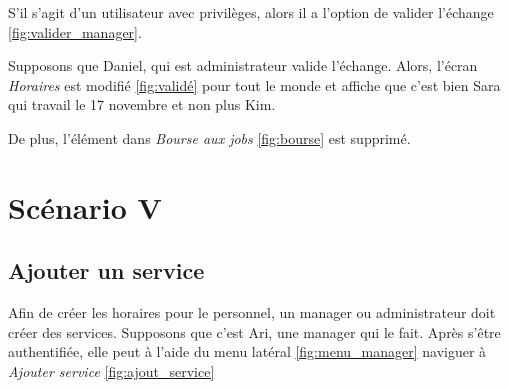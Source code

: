 S'il s'agit d'un utilisateur avec privilèges, alors il a l'option de valider l'échange \ref{fig:valider_manager}. 

Supposons que Daniel, qui est administrateur valide l'échange. Alors, l'écran \textit{Horaires} est modifié \ref{fig:validé}
pour tout le monde et affiche que c'est bien Sara qui travail le 17 novembre et non plus Kim. 

De plus, l'élément dans \textit{Bourse aux jobs} \ref{fig:bourse} est supprimé.
\newpage
\section[Ajouter un service - Scénario V]{Scénario V}
    \subsection*{Ajouter un service}
    Afin de créer les horaires pour le personnel, un manager ou administrateur doit créer des services. Supposons
    que c'est Ari, une manager qui le fait. Après s'être authentifiée, elle peut à l'aide du menu latéral \ref{fig:menu_manager} naviguer
    à \textit{Ajouter service} \ref{fig:ajout_service}

